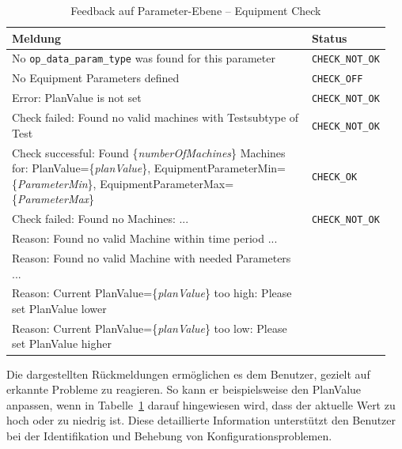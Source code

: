 \begin{table}[htb]
    \centering
    \footnotesize
    \renewcommand{\arraystretch}{1.1}
    \begin{tabular}{p{0.8\linewidth} p{0.15\linewidth}}
        \textbf{Meldung} & \textbf{Status} \\
        \midrule
        No \texttt{op\_data\_param\_type} was found for this parameter & \texttt{CHECK\_NOT\_OK} \\
        \midrule
        No Equipment Parameters defined & \texttt{CHECK\_OFF} \\
        \midrule
        Error: PlanValue is not set & \texttt{CHECK\_NOT\_OK} \\
        \midrule
        Check failed: Found no valid machines with Testsubtype of Test & \texttt{CHECK\_NOT\_OK} \\
        \midrule
        Check successful: Found \{\textit{numberOfMachines}\} Machines for: PlanValue=\{\textit{planValue}\}, EquipmentParameterMin=\{\textit{ParameterMin}\}, EquipmentParameterMax=\{\textit{ParameterMax}\} & \texttt{CHECK\_OK} \\
        \midrule
        Check failed: Found no Machines: ... & \texttt{CHECK\_NOT\_OK} \\
        \quad Reason: Found no valid Machine within time period ... & \\
        \quad Reason: Found no valid Machine with needed Parameters ... & \\
        \quad Reason: Current PlanValue=\{\textit{planValue}\} too high: Please set PlanValue lower & \\
        \quad Reason: Current PlanValue=\{\textit{planValue}\} too low: Please set PlanValue higher & \\
        \bottomrule
    \end{tabular}
    \caption{Feedback auf Parameter-Ebene -- Equipment Check}
    \label{tab:feedback-equipment}
\end{table}



Die dargestellten Rückmeldungen ermöglichen es dem Benutzer, gezielt auf erkannte Probleme zu reagieren. So kann er beispielsweise den PlanValue anpassen, wenn in Tabelle~\ref{tab:feedback-equipment} darauf hingewiesen wird, dass der aktuelle Wert zu hoch oder zu niedrig ist. Diese detaillierte Information unterstützt den Benutzer bei der Identifikation und Behebung von Konfigurationsproblemen.


